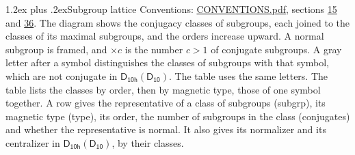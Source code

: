 \documentclass[10pt,a4paper]{article}
\makeatletter
\renewcommand\section{\@startsection{section}{1}{\z@}{-3ex plus -1ex minus -.2ex}%
  {1.2ex plus .2ex}{\normalfont\large\sffamily\bfseries\color{parttitle}}}
\numberwithin{equation}{section}
\newcommand{\grp}[1]{\mathsf{#1}}
\makeatother
\begin{document}
\section{Subgroup lattice}\label{s:subgroups}
Conventions: \href{../../CONVENTIONS.pdf}{CONVENTIONS.pdf}, sections \href{../../../rotation/CONVENTIONS.pdf\#conv.15}{15} and \href{../../CONVENTIONS.pdf\#conv.36}{36}.
The diagram shows the conjugacy classes of subgroups, each joined to the classes of its maximal subgroups, and the orders increase upward. \label{n:index.conjugates.c}\label{n:mark.conjugates}A normal subgroup is framed, and ${\times}c$ is the number $c > 1$ of conjugate subgroups. \label{n:mark.letter}A gray letter after a symbol distinguishes the classes of subgroups with that symbol, which are not conjugate in $\grp{D_{10h}}(\grp{D_{10}})$. The table uses the same letters. The table lists the classes by order, then by magnetic type, those of one symbol together. \label{n:head.subgroup}\label{n:head.magnetic.type}\label{n:head.order}\label{n:head.conjugates}\label{n:head.normal}A row gives the representative of a class of subgroups (subgrp), its magnetic type (type), its order, the number of subgroups in the class (conjugates) and whether the representative is normal. \label{n:head.normalizer}\label{n:head.centralizer}It also gives its normalizer and its centralizer in $\grp{D_{10h}}(\grp{D_{10}})$, by their classes. 
\end{document}

